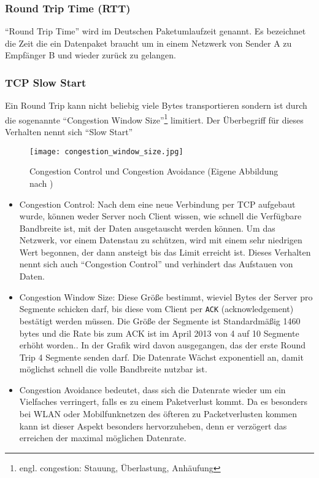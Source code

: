 
		\subsubsection{Round Trip Time (RTT)} %
		\label{ssub:rtt}
			"`Round Trip Time"' wird im Deutschen Paketumlaufzeit genannt. Es bezeichnet die Zeit die ein Datenpaket braucht um in einem Netzwerk von Sender A zu Empfänger B und wieder zurück zu gelangen.

		\subsubsection{TCP Slow Start} %
		\label{ssub:tcp_slow_start}

			Ein Round Trip kann nicht beliebig viele Bytes transportieren sondern ist durch die sogenannte "`Congestion Window Size"'\footnote{engl. congestion: Stauung, Überlastung, Anhäufung} limitiert. Der Überbegriff für dieses Verhalten nennt sich "`Slow Start"'

			\begin{figure}[htbp]
				\begin{center}
					\texttt{[image: congestion\_window\_size.jpg]}
					\caption{Congestion Control und Congestion Avoidance (Eigene Abbildung nach \autocite{grigorik13})}
					\label{fig:congestion_window_size}
				\end{center}
			\end{figure} 

			\begin{itemize}
				\item Congestion Control: Nach dem eine neue Verbindung per TCP aufgebaut wurde, können weder Server noch Client wissen, wie schnell die Verfügbare Bandbreite ist, mit der Daten ausgetauscht werden können. Um das Netzwerk, vor einem Datenstau zu schützen, wird mit einem sehr niedrigen Wert begonnen, der dann ansteigt bis das Limit erreicht ist. Dieses Verhalten nennt sich auch "`Congestion Control"' und verhindert das Aufstauen von Daten.
				\item Congestion Window Size: Diese Größe bestimmt, wieviel Bytes der Server pro Segmente schicken darf, bis diese vom Client per \texttt{ACK} (acknowledgement) bestätigt werden müssen. Die Größe der Segmente ist Standardmäßig 1460 bytes und die Rate bis zum ACK ist im April 2013 von 4 auf 10 Segmente erhöht worden.\autocite{grigorik13}. In der Grafik wird davon ausgegangen, das der erste Round Trip 4 Segmente senden darf. Die Datenrate Wächst exponentiell an, damit möglichst schnell die volle Bandbreite nutzbar ist.\\
				\item Congestion Avoidance bedeutet, dass sich die Datenrate wieder um ein Vielfaches verringert, falls es zu einem Paketverlust kommt. Da es besonders bei WLAN oder Mobilfunknetzen des öfteren zu Packetverlusten kommen kann ist dieser Aspekt besonders hervorzuheben, denn er verzögert das erreichen der maximal möglichen Datenrate.
			\end{itemize}

